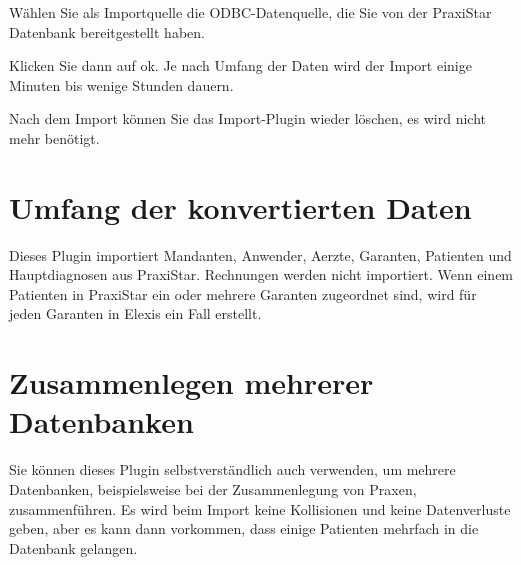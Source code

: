 \documentclass[a4paper]{scrartcl}
\begin{document}
Wählen Sie als Importquelle die ODBC-Datenquelle, die Sie von der PraxiStar Datenbank bereitgestellt haben.

Klicken Sie dann auf ok. Je nach Umfang der Daten wird der Import einige Minuten bis wenige Stunden dauern.

\bigskip

Nach dem Import können Sie das Import-Plugin wieder löschen, es wird nicht mehr benötigt.

\section{Umfang der konvertierten Daten}
Dieses Plugin importiert Mandanten, Anwender, Aerzte, Garanten, Patienten und Hauptdiagnosen aus PraxiStar. Rechnungen werden nicht importiert.
Wenn einem Patienten in PraxiStar ein oder mehrere Garanten zugeordnet sind, wird für jeden Garanten in Elexis ein Fall erstellt.

\section{Zusammenlegen mehrerer Datenbanken}
Sie können dieses Plugin selbstverständlich auch verwenden, um mehrere Datenbanken, beispielsweise bei der Zusammenlegung von Praxen, zusammenführen. Es wird beim Import keine Kollisionen und keine Datenverluste geben, aber es kann dann vorkommen, dass einige Patienten mehrfach in die Datenbank gelangen.
\end{document}
